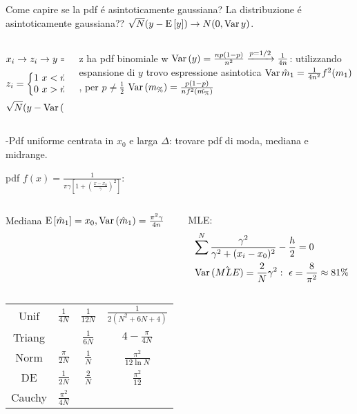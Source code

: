 \begin{wordonframe}{Come capire se la pdf \'e asintoticamente gaussiana?}
La distribuzione \'e asintoticamente gaussiana?? $\sqrt{N}(y-\operatorname{E}{[y]})\to N(0,\operatorname{Var}{y})$.
\begin{columns}[T]
\begin{column}{0.5\textwidth}
\begin{align*}
&x_i\to z_i\to y=\frac{1}{N}\sum z_i\\
&z_i=\left\{\begin{matrix}1\ x<\hat{m}_1\\0\ x>\hat{m}_1\\\end{matrix}\right.\\
&\sqrt{N}(y-\operatorname{Var}{(y)})\xrightarrow{\operatorname{\mathcal{P}}{}}N(0,\operatorname{Var}{(y)})
\end{align*}
\end{column}
\begin{column}{0.5\textwidth}
z ha pdf binomiale w $\operatorname{Var}{(y)}=\frac{np(1-p)}{n^2}\xrightarrow{p=1/2}\frac{1}{4n}$: utilizzando espansione di $y$ trovo espressione asintotica $\operatorname{Var}{\hat{m}_1}=\frac{1}{4n^2}f^2(m_1)$, per $p\neq\frac{1}{2}$ $\operatorname{Var}{(m_{\%})}=\frac{p(1-p)}{nf^2(\hat{m_{\%}})}$
\end{column}
\end{columns}

-Pdf uniforme centrata in $x_0$ e larga $\Delta$: trovare pdf di moda, mediana e midrange.

pdf $f(x)=\frac{1}{\pi\gamma[1+(\frac{x-x_0}{\gamma})^2]}$:
\begin{columns}[T]
\begin{column}{0.5\textwidth}
Mediana
$\operatorname{E}{[\hat{m}_1]}=x_0, \operatorname{Var}{(\hat{m}_1)}=\frac{\pi^2\gamma}{4n}$
\end{column}
\begin{column}{0.5\textwidth}
MLE:
\begin{align*}
&\sum^N\frac{\gamma^2}{\gamma^2+(x_i-x_0)^2}-\frac{h}{2}=0\\
&\operatorname{Var}{(\hat{MLE})}=\frac{2}{N}\gamma^2:\ \epsilon=\frac{8}{\pi^2}\approx81\%
\end{align*}
\end{column}
\end{columns}

\begin{tabular}{c|ccc}
Unif & $\frac{1}{4N}$ & $\frac{1}{12N}$ & $\frac{1}{2(N^2+6N+4)}$\\
Triang & & $\frac{1}{6N}$ & $4-\frac{\pi}{4N}$\\
Norm & $\frac{\pi}{2N}$ & $\frac{1}{N}$ & $\frac{\pi^2}{12\ln{N}}$\\
DE & $\frac{1}{2N}$ & $\frac{2}{N}$ & $\frac{\pi^2}{12}$\\
Cauchy & $\frac{\pi^2}{4N}$ & & \\
\end{tabular}\end{wordonframe}

